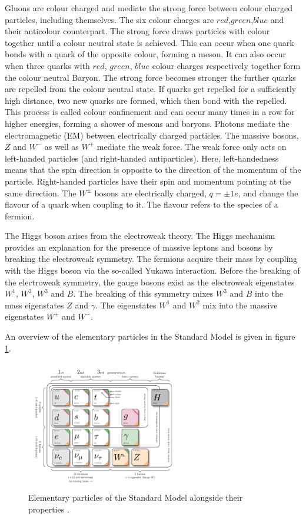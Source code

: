 Gluons are colour charged and mediate the strong force between colour charged particles, including themselves. The six colour charges are $red$,$green$,$blue$ and their anticolour counterpart. The strong force draws particles with colour together until a colour neutral state is achieved. This can occur when one quark bonds with a quark of the opposite colour, forming a meson. It can also occur when three quarks with $red$, $green$, $blue$ colour charges respectively together form the colour neutral Baryon. 
The strong force becomes stronger the further quarks are repelled from the colour neutral state. If quarks get repelled for a sufficiently high distance, two new quarks are formed, which then bond with the repelled. This process is called colour confinement and can occur many times in a row for higher energies, forming a shower of mesons and baryons. 
Photons mediate the electromagnetic (EM) between electrically charged particles. The massive bosons, $Z$ and $W^{-}$ as well as $W^{+}$ mediate the weak force. The weak force only acts on left-handed particles (and right-handed antiparticles). Here, left-handedness means that the spin direction is opposite to the direction of the momentum of the particle. Right-handed particles have their spin and momentum pointing at the same direction. 
The $W^{\pm}$ bosons are electrically charged, $q = \pm 1e$, and change the flavour of a quark when coupling to it. The flavour refers to the species of a fermion. 
 
The Higgs boson arises from the electroweak theory. The Higgs mechanism provides an explanation for the presence of massive leptons and bosons by breaking the electroweak symmetry. The fermions acquire their mass by coupling with the Higgs boson via the so-called Yukawa interaction.
Before the breaking of the electroweak symmetry, the gauge bosons exist as the electroweak eigenstates $W^1$, $W^2$, $W^3$ and $B$. The breaking of this symmetry mixes $W^3$ and $B$ into the mass eigenstates $Z$ and $\gamma$. 
The eigenstates $W^1$ and $W^2$ mix into the massive eigenstates $W^+$ and $W^-$. 

An overview of the elementary particles in the Standard Model is given in figure \ref{fig:standard_model}.

\begin{figure}
    \centering
    \includegraphics[width=0.6\textwidth]{Plots/model-physics.pdf}
    \caption{Elementary particles of the Standard Model alongside their properties \cite{sm_table}.}
    \label{fig:standard_model}
\end{figure}

